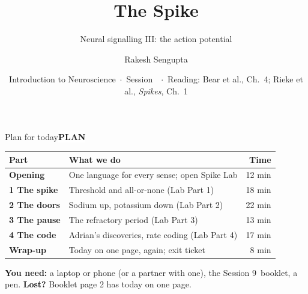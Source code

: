 \documentclass[aspectratio=169,11pt]{beamer}
\title{The Spike}
\subtitle{Neural signalling III: the action potential}
\author{Rakesh Sengupta}
\institute{School of Interwoven Arts and Sciences, Krea University}
\date{Introduction to Neuroscience \,$\cdot$\, Session \sessnum\ \,$\cdot$\, Reading: Bear et al., Ch.~4; Rieke et al., \emph{Spikes}, Ch.~1}
\newcommand{\tagpill}[3]{{\normalfont\footnotesize\setlength{\fboxsep}{2.5pt}\colorbox{#1}{\textcolor{#2}{\bfseries #3}}}}
\newcommand{\tPlan}{\tagpill{white}{kprimary}{PLAN}}
\newcommand{\sessnum}{9}  %
\begin{document}
\begin{frame}[plain]
  \vspace{1.2cm}
  \titlepage
\end{frame}

\begin{frame}{Plan for today}{\tPlan}
  \renewcommand{\arraystretch}{1.3}
  \begin{tabular}{@{}>{\raggedright\arraybackslash\bfseries}p{3.0cm}>{\raggedright\arraybackslash}p{8.3cm}r@{}}
    \toprule
    Part & What we do & Time\\
    \midrule
    Opening & One language for every sense; open Spike Lab & 12 min\\
    1 The spike & Threshold and all-or-none (Lab Part 1) & 18 min\\
    2 The doors & Sodium up, potassium down (Lab Part 2) & 22 min\\
    3 The pause & The refractory period (Lab Part 3) & 13 min\\
    4 The code & Adrian's discoveries, rate coding (Lab Part 4) & 17 min\\
    Wrap-up & Today on one page, again; exit ticket & 8 min\\
    \bottomrule
  \end{tabular}
  \vspace{0.7em}

  \small\textbf{You need:} a laptop or phone (or a partner with one), the Session \sessnum\ booklet, a pen. \textbf{Lost?} Booklet page 2 has today on one page.
\end{frame}
\end{document}

